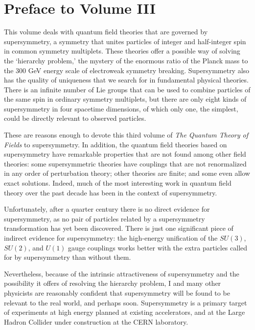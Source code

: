 \section*{Preface to Volume III}

This volume deals with quantum field theories that are governed by
supersymmetry, a symmetry that unites particles of integer and half-integer
spin in common symmetry multiplets. These theories offer a possible way of
solving the `hierarchy problem,' the mystery of the enormous ratio of the
Planck mass to the 300 GeV energy scale of electroweak symmetry breaking.
Supersymmetry also has the quality of uniqueness that we search for in
fundamental physical theories. There is an infinite number of Lie groups that
can be used to combine particles of the same spin in ordinary symmetry
multiplets, but there are only eight kinds of supersymmetry in four spacetime
dimensions, of which only one, the simplest, could be directly relevant to
observed particles.

These are reasons enough to devote this third volume of \emph{The Quantum
Theory of Fields} to supersymmetry. In addition, the quantum field theories
based on supersymmetry have remarkable properties that are not found among
other field theories: some supersymmetric theories have couplings that are not
renormalized in any order of perturbation theory; other theories are finite;
and some even allow exact solutions. Indeed, much of the most interesting work
in quantum field theory over the past decade has been in the context of
supersymmetry.

Unfortunately, after a quarter century there is no direct evidence for
supersymmetry, as no pair of particles related by a supersymmetry
transformation has yet been discovered. There is just one significant piece of
indirect evidence for supersymmetry: the high-energy unification of the
$SU(3)$, $SU(2)$, and $U(1)$ gauge couplings works better with the extra
particles called for by supersymmetry than without them.

Nevertheless, because of the intrinsic attractiveness of supersymmetry and the
possibility it offers of resolving the hierarchy problem, I and many other
physicists are reasonably confident that supersymmetry will be found to be
relevant to the real world, and perhaps soon. Supersymmetry is a primary target
of experiments at high energy planned at existing accelerators, and at the
Large Hadron Collider under construction at the CERN laboratory.

